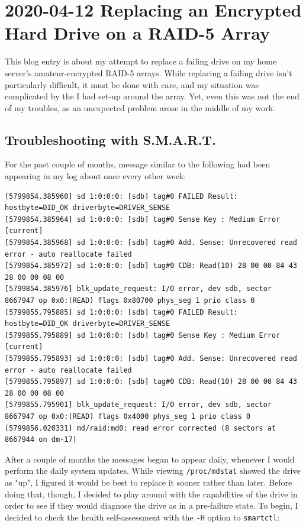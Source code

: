 \documentclass{article}
\begin{document}
\section{2020-04-12 Replacing an Encrypted Hard Drive on a RAID-5 Array}
This\label{2020-04-12-replacing-hard-drive} blog entry is about my attempt to replace a failing drive on my home server's amateur-encrypted RAID-5 arrays.  While replacing a failing drive isn't particularly difficult, it must be done with care, and my situation was complicated by the  I had set-up around the array.  Yet, even this was not the end of my troubles, as an unexpected problem arose in the middle of my work.

\subsection{Troubleshooting with S.M.A.R.T.}
For the past couple of months, message similar to the following had been appearing in my log about once every other week:

\begin{verbatim}
[5799854.385960] sd 1:0:0:0: [sdb] tag#0 FAILED Result: hostbyte=DID_OK driverbyte=DRIVER_SENSE
[5799854.385964] sd 1:0:0:0: [sdb] tag#0 Sense Key : Medium Error [current]
[5799854.385968] sd 1:0:0:0: [sdb] tag#0 Add. Sense: Unrecovered read error - auto reallocate failed
[5799854.385972] sd 1:0:0:0: [sdb] tag#0 CDB: Read(10) 28 00 00 84 43 28 00 00 08 00
[5799854.385976] blk_update_request: I/O error, dev sdb, sector 8667947 op 0x0:(READ) flags 0x80700 phys_seg 1 prio class 0
[5799855.795885] sd 1:0:0:0: [sdb] tag#0 FAILED Result: hostbyte=DID_OK driverbyte=DRIVER_SENSE
[5799855.795889] sd 1:0:0:0: [sdb] tag#0 Sense Key : Medium Error [current]
[5799855.795893] sd 1:0:0:0: [sdb] tag#0 Add. Sense: Unrecovered read error - auto reallocate failed
[5799855.795897] sd 1:0:0:0: [sdb] tag#0 CDB: Read(10) 28 00 00 84 43 28 00 00 08 00
[5799855.795901] blk_update_request: I/O error, dev sdb, sector 8667947 op 0x0:(READ) flags 0x4000 phys_seg 1 prio class 0
[5799856.020331] md/raid:md0: read error corrected (8 sectors at 8667944 on dm-17)
\end{verbatim}

After a couple of months the messages began to appear daily, whenever I would perform the daily system updates.  While viewing \texttt{/proc/mdstat} showed the drive as "up", I figured it would be best to replace it sooner rather than later.  Before doing that, though, I decided to play around with the  capabilities of the drive in order to see if they would diagnose the drive as in a pre-failure state.   To begin, I decided to check the health self-assessment with the \texttt{-H} option to \texttt{smartctl}:
\end{document}
